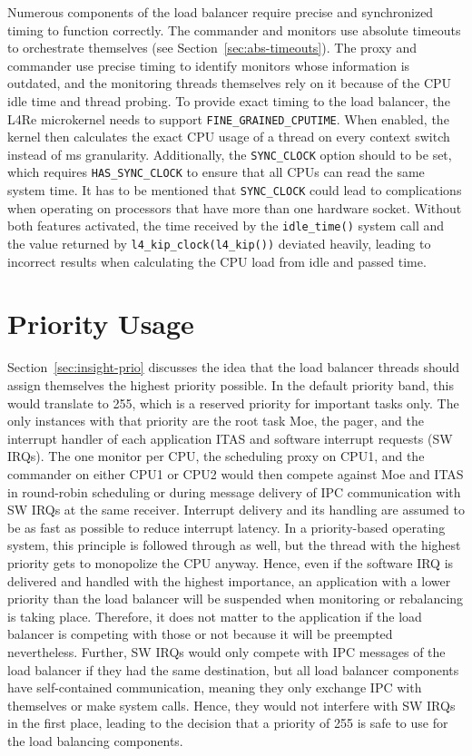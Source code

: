 Numerous components of the load balancer require precise and synchronized timing to function correctly.
The commander and monitors use absolute timeouts to orchestrate themselves (see Section~\ref{sec:abs-timeouts}).
The proxy and commander use precise timing to identify monitors whose information is outdated, and the monitoring threads themselves rely on it because of the CPU idle time and thread probing.
To provide exact timing to the load balancer, the L4Re microkernel needs to support \texttt{FINE\_GRAINED\_CPUTIME}.
When enabled, the kernel then calculates the exact CPU usage of a thread on every context switch instead of \si{\ms} granularity.
Additionally, the \texttt{SYNC\_CLOCK} option should to be set, which requires \texttt{HAS\_SYNC\_CLOCK} to ensure that all CPUs can read the same system time.
It has to be mentioned that \texttt{SYNC\_CLOCK} could lead to complications when operating on processors that have more than one hardware socket.
Without both features activated, the time received by the \texttt{idle\_time()} system call and the value returned by \texttt{l4\_kip\_clock(l4\_kip())} deviated heavily, leading to incorrect results when calculating the CPU load from idle and passed time.

\iffalse
\section{Priority Usage}

Section~\ref{sec:insight-prio} discusses the idea that the load balancer threads should assign themselves the highest priority possible.
In the default priority band, this would translate to 255, which is a reserved priority for important tasks only.
The only instances with that priority are the root task Moe, the pager, and the interrupt handler of each application ITAS and software interrupt requests (SW IRQs).
The one monitor per CPU, the scheduling proxy on CPU1, and the commander on either CPU1 or CPU2 would then compete against Moe and ITAS in round-robin scheduling or during message delivery of IPC communication with SW IRQs at the same receiver.
Interrupt delivery and its handling are assumed to be as fast as possible to reduce interrupt latency.
In a priority-based operating system, this principle is followed through as well, but the thread with the highest priority gets to monopolize the CPU anyway.
Hence, even if the software IRQ is delivered and handled with the highest importance, an application with a lower priority than the load balancer will be suspended when monitoring or rebalancing is taking place.
Therefore, it does not matter to the application if the load balancer is competing with those or not because it will be preempted nevertheless.
Further, SW IRQs would only compete with IPC messages of the load balancer if they had the same destination, but all load balancer components have self-contained communication, meaning they only exchange IPC with themselves or make system calls.
Hence, they would not interfere with SW IRQs in the first place, leading to the decision that a priority of 255 is safe to use for the load balancing components.

